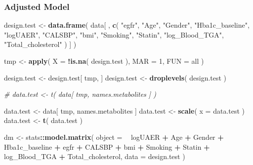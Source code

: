 \documentclass[]{article}
\newenvironment{Shaded}{\begin{snugshade}}{\end{snugshade}}
\newcommand{\CommentTok}[1]{\textcolor[rgb]{0.56,0.35,0.01}{\textit{#1}}}
\newcommand{\DataTypeTok}[1]{\textcolor[rgb]{0.13,0.29,0.53}{#1}}
\newcommand{\DecValTok}[1]{\textcolor[rgb]{0.00,0.00,0.81}{#1}}
\newcommand{\KeywordTok}[1]{\textcolor[rgb]{0.13,0.29,0.53}{\textbf{#1}}}
\newcommand{\NormalTok}[1]{#1}
\newcommand{\OperatorTok}[1]{\textcolor[rgb]{0.81,0.36,0.00}{\textbf{#1}}}
\newcommand{\StringTok}[1]{\textcolor[rgb]{0.31,0.60,0.02}{#1}}
\begin{document}
\newpage

\hypertarget{adjusted-model-2}{%
\subsubsection{Adjusted Model}\label{adjusted-model-2}}

\begin{Shaded}
\begin{Highlighting}[]
\NormalTok{design.test <-}\StringTok{ }
\StringTok{  }\KeywordTok{data.frame}\NormalTok{( }
\NormalTok{    data[ , }
          \KeywordTok{c}\NormalTok{(}
            \StringTok{"egfr"}\NormalTok{,}
            \StringTok{"Age"}\NormalTok{,}
            \StringTok{"Gender"}\NormalTok{, }
            \StringTok{"Hba1c_baseline"}\NormalTok{,}
            \StringTok{"logUAER"}\NormalTok{,}
            \StringTok{"CALSBP"}\NormalTok{,}
            \StringTok{"bmi"}\NormalTok{,}
            \StringTok{"Smoking"}\NormalTok{,}
            \StringTok{"Statin"}\NormalTok{,}
            \StringTok{"log_Blood_TGA"}\NormalTok{, }
            \StringTok{"Total_cholesterol"}
\NormalTok{          )}
\NormalTok{          ]}
\NormalTok{  )}

\NormalTok{tmp <-}\StringTok{ }\KeywordTok{apply}\NormalTok{( }\DataTypeTok{X =} \OperatorTok{!}\KeywordTok{is.na}\NormalTok{( design.test ), }\DataTypeTok{MAR =} \DecValTok{1}\NormalTok{, }\DataTypeTok{FUN =}\NormalTok{ all )}

\NormalTok{design.test <-}\StringTok{ }\NormalTok{design.test[ tmp, ]}
\NormalTok{design.test <-}\StringTok{ }\KeywordTok{droplevels}\NormalTok{( design.test )}

\CommentTok{# data.test <- t( data[ tmp, names.metabolites ] )}

\NormalTok{data.test <-}\StringTok{ }\NormalTok{data[ tmp, names.metabolites ]}
\NormalTok{data.test <-}\StringTok{ }\KeywordTok{scale}\NormalTok{( }\DataTypeTok{x =}\NormalTok{ data.test )}
\NormalTok{data.test <-}\StringTok{ }\KeywordTok{t}\NormalTok{( data.test )}

\NormalTok{dm <-}\StringTok{ }
\StringTok{  }\NormalTok{stats}\OperatorTok{::}\KeywordTok{model.matrix}\NormalTok{( }
    \DataTypeTok{object =} 
      \OperatorTok{~}\StringTok{ }\NormalTok{logUAER }\OperatorTok{+}\StringTok{ }
\StringTok{      }\NormalTok{Age }\OperatorTok{+}\StringTok{ }
\StringTok{      }\NormalTok{Gender }\OperatorTok{+}
\StringTok{      }\NormalTok{Hba1c_baseline }\OperatorTok{+}\StringTok{ }
\StringTok{      }\NormalTok{egfr }\OperatorTok{+}\StringTok{ }
\StringTok{      }\NormalTok{CALSBP }\OperatorTok{+}\StringTok{ }
\StringTok{      }\NormalTok{bmi }\OperatorTok{+}\StringTok{ }
\StringTok{      }\NormalTok{Smoking }\OperatorTok{+}
\StringTok{      }\NormalTok{Statin }\OperatorTok{+}
\StringTok{      }\NormalTok{log_Blood_TGA }\OperatorTok{+}\StringTok{ }
\StringTok{      }\NormalTok{Total_cholesterol,}
    \DataTypeTok{data =}\NormalTok{ design.test}
\NormalTok{  )}


\end{Highlighting}
\end{Shaded}
\end{document}
